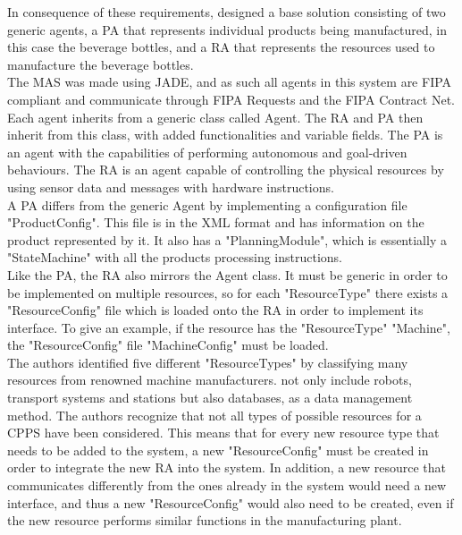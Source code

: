 In consequence of these requirements, \citeauthor{bottling_plant_part1} designed a base solution consisting of two generic agents, a \acrfull{PA} that represents individual products being manufactured, in this case the beverage bottles, and a \acrfull{RA} that represents the resources used to manufacture the beverage bottles.\\

The \acrshort{MAS} was made using \acrshort{JADE}, and as such all agents in this system are \acrshort{FIPA} compliant and communicate through \acrshort{FIPA} Requests and the \acrshort{FIPA} Contract Net.\\

Each agent inherits from a generic class called Agent. The \acrshort{RA} and \acrshort{PA} then inherit from this class, with added functionalities and variable fields. The \acrshort{PA} is an agent with the capabilities of performing autonomous and goal-driven behaviours. The \acrshort{RA} is an agent capable of controlling the physical resources by using sensor data and messages with hardware instructions.\\

A \acrshort{PA} differs from the generic Agent by implementing a configuration file "ProductConfig". This file is in the \acrshort{XML} format and has information on the product represented by it. It also has a "PlanningModule", which is essentially a "StateMachine" with all the products processing instructions.\\

Like the \acrshort{PA}, the \acrshort{RA} also mirrors the Agent class. It must be generic in order to be implemented on multiple resources, so for each "ResourceType" there exists a "ResourceConfig" file which is loaded onto the \acrshort{RA} in order to implement its interface. To give an example, if the resource has the "ResourceType" "Machine", the "ResourceConfig" file "MachineConfig" must be loaded.\\

The authors identified five different "ResourceTypes" by classifying many resources from renowned machine manufacturers.  not only include robots, transport systems and stations but also databases, as a data management method. The authors recognize that not all types of possible resources for a \acrshort{CPPS} have been considered. This means that for every new resource type that needs to be added to the system, a new "ResourceConfig" must be created in order to integrate the new \acrshort{RA} into the system. In addition, a new resource that communicates differently from the ones already in the system would need a new interface, and thus a new "ResourceConfig" would also need to be created, even if the new resource performs similar functions in the manufacturing plant.\\

